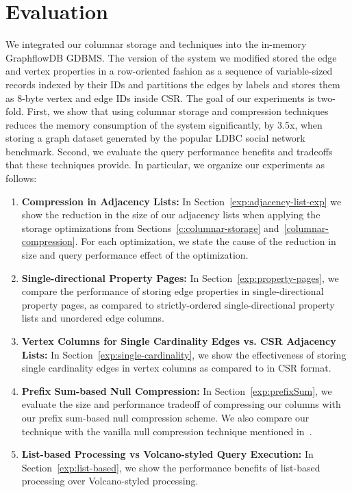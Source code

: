 \chapter{Evaluation}
\label{c:evaluation}

We integrated our columnar storage and techniques into the in-memory GraphflowDB GDBMS. The version of the system we modified stored the edge and vertex properties in a row-oriented fashion as a sequence of variable-sized records indexed by their IDs and partitions the edges by labels and stores them as 8-byte vertex and edge IDs inside CSR. The goal of our experiments is two-fold. First, we show that using columnar storage and compression techniques reduces the memory consumption of the system significantly, by 3.5x, when storing a graph dataset generated by the popular LDBC social network benchmark. Second, we evaluate the query performance benefits and tradeoffs that these techniques provide. In particular, we organize our experiments as follows:

\begin{enumerate}
	\item \textbf{Compression in Adjacency Lists:}  In Section~\ref{exp:adjacency-list-exp} we show the reduction in the size of our adjacency lists when applying the storage optimizations from Sections~\ref{c:columnar-storage} and~\ref{columnar-compression}. For each optimization, we state the cause of the reduction in size and query performance effect of the optimization.
		
	\item \textbf{Single-directional Property Pages:} In Section~\ref{exp:property-pages}, we compare the performance of storing edge properties in single-directional property pages, as compared to strictly-ordered single-directional property lists and unordered edge columns.
	
	\item \textbf{Vertex Columns for Single Cardinality Edges vs. CSR Adjacency Lists:}  In Section~\ref{exp:single-cardinality}, we show the effectiveness of storing single cardinality edges in vertex  columns as compared to in CSR format. 
	
	\item \textbf{Prefix Sum-based Null Compression:}  In Section~\ref{exp:prefixSum}, we evaluate the size  and performance tradeoff of compressing our columns with our prefix sum-based null compression scheme. We also compare our technique with the vanilla null compression technique mentioned in~\cite{abadi-sparse-col}.%

	\item \textbf{List-based Processing vs Volcano-styled Query Execution:} In Section~\ref{exp:list-based}, we show the performance benefits of list-based processing over Volcano-styled processing.
	
\end{enumerate}

